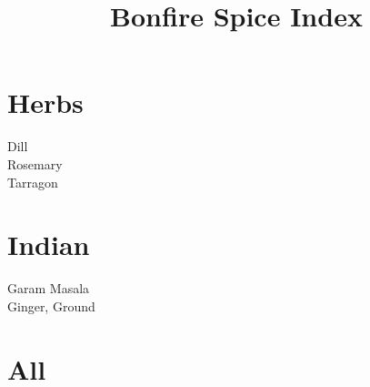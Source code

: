 \documentclass[twocolumn]{article}
\title{Bonfire Spice Index}
\begin{document}
\maketitle

\section*{Herbs}

Dill\\
Rosemary\\
Tarragon\\

\section*{Indian}

Garam Masala\\
Ginger, Ground\\

\section*{All}
\end{document}
